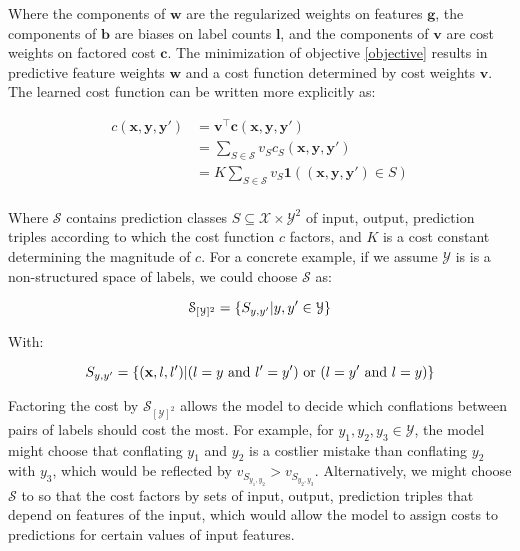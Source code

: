 \documentclass[11pt,letterpaper]{article}
\begin{document}
Where the components of $\mathbf{w}$ are the regularized weights on features 
$\mathbf{g}$, the components of $\mathbf{b}$ are biases on label counts 
$\mathbf{l}$, and the components of $\mathbf{v}$ are cost weights on 
factored cost $\mathbf{c}$.  The minimization of objective \ref{objective} 
results in predictive feature weights $\mathbf{w}$ and a cost function 
determined by cost weights $\mathbf{v}$.  The learned cost function can
be written more explicitly as:

\begin{equation}
\begin{split}
c(\mathbf{x}, \mathbf{y}, \mathbf{y'}) & = \mathbf{v}^\top\mathbf{c}(\mathbf{x},\mathbf{y},\mathbf{y'}) \\
                                       & = \sum_{S\in\mathcal{S}}v_Sc_S(\mathbf{x},\mathbf{y},\mathbf{y'}) \\
									   & = K\sum_{S\in\mathcal{S}}v_S\mathbf{1}((\mathbf{x},\mathbf{y},\mathbf{y'})\in S) \\
\end{split}
\end{equation}

Where $\mathcal{S}$ contains prediction classes 
$S\subseteq \mathcal{X}\times\mathcal{Y}^2$ of input, output, prediction 
triples according to which the cost function $c$ factors, and $K$ is a cost 
constant determining the magnitude of $c$.  For a concrete example, if we 
assume $\mathcal{Y}$ is is a non-structured space of labels, we could choose 
$\mathcal{S}$ as:

\begin{equation}
\mathcal{S}_{[\mathcal{Y}]^2} = \{ S_{y,y'} | y,y'\in\mathcal{Y}\} \\
\end{equation}

With:

\begin{equation}
S_{y,y'}=\{ (\mathbf{x},l, l') | (l=y\text{ and }l'=y')\text{ or }(l=y'\text{ and }l=y) \} \\
\end{equation}

Factoring the cost by $\mathcal{S}_{[\mathcal{Y}]^2}$ allows the model to 
decide which conflations between pairs of labels should cost the most.  For 
example, for $y_1,y_2,y_3\in\mathcal{Y}$, the model might choose that 
conflating $y_1$ and $y_2$ is a costlier mistake than conflating $y_2$ with 
$y_3$, which would be reflected by $v_{S_{y_1,y_2}} > v_{S_{y_2,y_3}}$.  
Alternatively, we might choose $\mathcal{S}$ to so that the cost factors by 
sets of input, output, prediction triples that depend on features of the 
input, which would allow the model to assign costs to predictions for certain 
values of input features.
\end{document}
